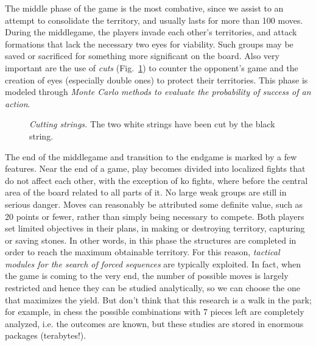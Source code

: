 The middle phase of the game is the most combative, since we assist to an attempt to consolidate the territory, and usually lasts for more than 100 moves. During the middlegame, the players invade each other's territories, and attack formations that lack the necessary two eyes for viability. Such groups may be saved or sacrificed for something more significant on the board. Also very important are the use of \emph{cuts} (Fig.~\ref{Cuts}) to counter the opponent's game and the creation of eyes (especially double ones) to protect their territories. This phase is modeled through \emph{Monte Carlo methods to evaluate the probability of success of an action}.
\begin{figure}[h!t]
\centering
{}
\caption{\emph{Cutting strings.} The two white strings have been cut by the black string.}\label{Cuts}
\end{figure}

The end of the middlegame and transition to the endgame is marked by a few features. Near the end of a game, play becomes divided into localized fights that do not affect each other, with the exception of ko fights, where before the central area of the board related to all parts of it. No large weak groups are still in serious danger. Moves can reasonably be attributed some definite value, such as 20 points or fewer, rather than simply being necessary to compete. Both players set limited objectives in their plans, in making or destroying territory, capturing or saving stones. In other words, in this phase the structures are completed in order to reach the maximum obtainable territory. For this reason, \emph{tactical modules for the search of forced sequences} are typically exploited. In fact, when the game is coming to the very end, the number of possible moves is largely restricted and hence they can be studied analytically, so we can choose the one that maximizes the yield. But don't think that this research is a walk in the park; for example, in chess the possible combinations with 7 pieces left are completely analyzed, i.e. the outcomes are known, but these studies are stored in enormous packages (terabytes!).
